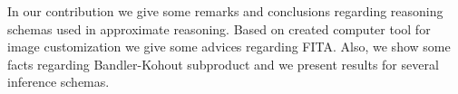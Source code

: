 
In our contribution we give some remarks and conclusions regarding reasoning schemas used in approximate reasoning. Based on created computer tool for image customization we give some advices regarding FITA. Also, we show some facts regarding Bandler-Kohout subproduct and we present results for several inference schemas.


